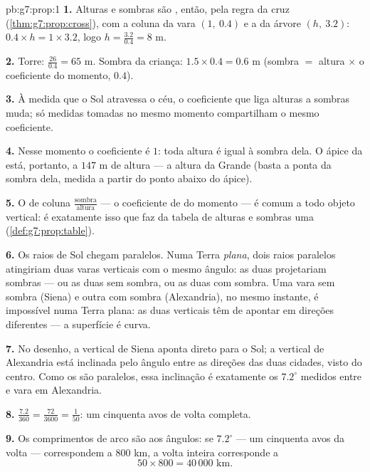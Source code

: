\begin{solution}{pb:g7:prop:1}
\textbf{1.} Alturas e sombras são , então, pela regra da
cruz (\cref{thm:g7:prop:cross}), com a coluna da vara $(1,\ 0.4)$ e a
da árvore $(h,\ 3.2)$: $0.4 \times h = 1 \times 3.2$, logo
$h = \frac{3.2}{0.4} = 8$ m.

\textbf{2.} Torre: $\frac{26}{0.4} = 65$ m. Sombra da criança:
$1.5 \times 0.4 = 0.6$ m (sombra $=$ altura $\times$ o coeficiente do
momento, $0.4$).

\textbf{3.} À medida que o Sol atravessa o céu, o coeficiente que liga
alturas a sombras muda; só medidas tomadas no mesmo momento
compartilham o mesmo coeficiente.

\textbf{4.} Nesse momento o coeficiente é $1$: toda altura é igual à
sombra dela. O ápice da  está, portanto, a $147$ m de altura
--- a altura da Grande  (basta a ponta da sombra dela, medida a
partir do ponto abaixo do ápice).

\textbf{5.} O  de coluna $\frac{\text{sombra}}{\text{altura}}$
--- o coeficiente de  do momento --- é comum a todo
objeto vertical: é exatamente isso que faz da tabela de alturas e
sombras uma  (\cref{def:g7:prop:table}).

\textbf{6.} Os raios de Sol chegam paralelos. Numa Terra \emph{plana},
dois raios paralelos atingiriam duas varas verticais com o mesmo
ângulo: as duas projetariam sombras  --- ou as duas sem
sombra, ou as duas com sombra. Uma vara sem sombra (Siena) e outra com
sombra (Alexandria), no mesmo instante, é impossível numa Terra plana:
as duas verticais têm de apontar em direções diferentes --- a
superfície é curva.

\textbf{7.} No desenho, a vertical de Siena aponta direto para o Sol; a
vertical de Alexandria está inclinada pelo ângulo entre as direções das
duas cidades, visto do centro. Como os  são paralelos, essa
inclinação é exatamente os $7.2^\circ$ medidos entre  e vara em
Alexandria.

\textbf{8.} $\frac{7.2}{360} = \frac{72}{3600} = \frac{1}{50}$: um
cinquenta avos de volta completa.

\textbf{9.} Os comprimentos de arco são  aos ângulos: se
$7.2^\circ$ --- um cinquenta avos da volta --- correspondem a $800$ km,
a volta inteira corresponde a
\[
50 \times 800 = 40\,000 \text{ km}.
\]


\end{solution}
